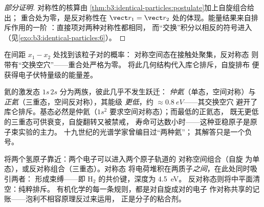 \begin{proof}[部分证明]
对称性的核算由
\cref{thm:b3:identical-particles:postulate}加上自旋组合给出；
重合处为零，是反对称性在
$\vect r_1 = \vect r_2$ 处的体现。能量结果来自排斥作用的一阶
：直接项对两种对称性都相同，
而“交换”积分以相反的符号进入
（见\cref{exo:b3:identical-particles:6}）。
\end{proof}

\begin{omfigure}

{\small 在间距 $x_1 - x_2$ 处找到该粒子对的概率：
对称空间态在接触处聚集，反对称态
则带有“交换空穴”——重合处严格为零。
将此几何结构代入库仑排斥，自旋排布
便获得电子伏特量级的能量差。}
\end{omfigure}

\begin{example}[同一原子中的两种氦]\label{ex:b3:identical-particles:helium}
氦的激发态 $1s\,2s$ 分为两族，彼此几乎不发生跃迁：
\emph{仲氦}（单态，空间对称）与
\emph{正氦}（三重态，空间反对称），其能级
\emph{更低}，约 $\approx\qty{0.8}{eV}$——其交换空穴
避开了库仑排斥。基态必然是仲氦（$1s^2$
要求空间对称态）；而最低的正氦态，
既无更低的三重态可供衰变，自旋翻转又被禁戒，
寿命可达数小时——这种亚稳原子是原子束实验的主力。
十九世纪的光谱学家曾编目过“两种氦”；
其解答只是一个负号。
\end{example}

\begin{example}[共价键]\label{ex:b3:identical-particles:bond}
将两个氢原子靠近：两个电子可以进入两个原子轨道的
对称空间组合（自旋
为单态），或反对称组合（三重态）。对称态
将电荷堆积在两质子\emph{之间}，在此处同时吸引两者：
形成束缚——即 H$_2$ 的共价键，深度为 \qty{4.5}{eV}。
反对称态则将中平面清空：纯粹排斥。
有机化学的每一条规则，都是对自旋成对的电子
作对称共享的记账——泡利不相容原理反过来运用，
正是分子的粘合剂。
\end{example}

